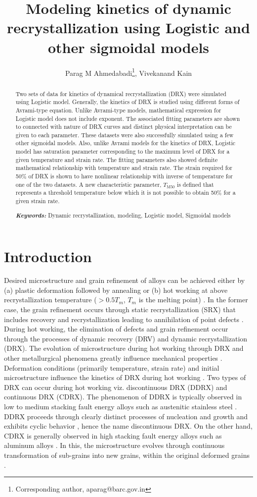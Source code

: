 \documentclass[a4paper, 11pt, dvipsnames]{article}
\title{Modeling kinetics of dynamic recrystallization using Logistic and other sigmoidal models}
\date{}
\author{Parag M Ahmedabadi\footnote{Corresponding author, aparag@barc.gov.in}, {}{} Vivekanand Kain}
\affil{Materials Processing \& Corrosion Engineering Division, Bhabha Atomic Research Centre, Trombay, Mumbai 400085, India}
\begin{document}
%
\maketitle
\begin{abstract}
Two sets of data for kinetics of dynamical recrystallization (DRX) were simulated using Logistic model. Generally, the kinetics of DRX is studied using different forms of Avrami-type equation. Unlike Avrami-type models, mathematical expression for Logistic model does not include exponent. The associated fitting parameters are shown to connected with nature of DRX curves and distinct physical interpretation can be given to each parameter. These datasets were also successfully simulated using a few other sigmoidal models. Also, unlike Avrami models for the kinetics of DRX, Logistic model has saturation parameter corresponding to the maximum level of DRX for a given temperature and strain rate. The fitting parameters also showed definite mathematical relationship with temperature and strain rate. The strain required for 50\% of DRX is shown to have nonlinear relationship with inverse of temperature for one of the two datasets. A new characteristic parameter, $T_{\text{M50}}$ is defined that represents a threshold temperature below which it is not possible to obtain 50\% for a given strain rate.

\textbf{\textit{Keywords:}} Dynamic recrystallization, modeling, Logistic model, Sigmoidal models
\end{abstract}
\section{Introduction}
Desired microstructure and grain refinement of alloys can be achieved either by (a) plastic deformation followed by annealing or (b) hot working at above recrystallization temperature ($> 0.5T_m${}, $T_m$ is the melting point) \cite{A1}. In the former case, the grain refinement occurs through static recrystallization ({\small SRX}) that includes recovery and recrystallization leading to annihilation of point defects \cite{A2, A3, A4, A5}. During hot working, the elimination of defects and grain refinement occur through the processes of dynamic recovery ({\small DRV}) and dynamic recrystallization (DRX). The evolution of microstructure during hot working through DRX and other metallurgical phenomena greatly influence mechanical properties \cite{A6}. Deformation conditions (primarily temperature, strain rate) and initial microstructure influence the kinetics of DRX during hot working \cite{A7, A8}. Two types of DRX can occur during hot working viz. discontinuous DRX ({\small DDRX}) and continuous DRX ({\small CDRX}). The phenomenon of {\small DDRX} is typically observed in low to medium stacking fault energy alloys such as austenitic stainless steel \cite{A9}. DDRX proceeds through clearly distinct processes of nucleation and growth and exhibits cyclic behavior \cite{A9}, hence the name discontinuous DRX. On the other hand, {\small CDRX} is generally observed in high stacking fault energy alloys such as aluminum alloys \cite{A10}. In this, the microstructure evolves through continuous transformation of sub-grains into new grains, within the original deformed grains \cite{A10}.
\end{document}
